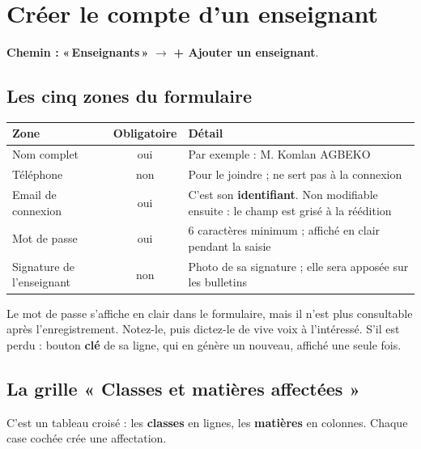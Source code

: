 \documentclass[11pt,a4paper]{article}
\newcommand{\menu}[1]{\textbf{«\,#1\,»}}
\newcommand{\bouton}[1]{\textbf{#1}}
\begin{document}
\newpage

\section{Créer le compte d'un enseignant}

\textbf{Chemin :} \menu{Enseignants} $\rightarrow$ \bouton{+ Ajouter un enseignant}.

\subsection{Les cinq zones du formulaire}

\begin{center}
\renewcommand{\arraystretch}{1.25}
\begin{tabularx}{\textwidth}{@{} >{\raggedright}p{4.2cm} c X@{}}
\toprule
\textbf{Zone} & \textbf{Obligatoire} & \textbf{Détail} \\
\midrule
Nom complet & oui & Par exemple : M. Komlan AGBEKO \\
Téléphone & non & Pour le joindre ; ne sert pas à la connexion \\
Email de connexion & oui & C'est son \textbf{identifiant}. Non modifiable ensuite : le champ
est grisé à la réédition \\
Mot de passe & oui & 6 caractères minimum ; affiché en clair pendant la saisie \\
Signature de l'enseignant & non & Photo de sa signature ; elle sera apposée sur les bulletins \\
\bottomrule
\end{tabularx}
\end{center}

\begin{boiteattention}
Le mot de passe s'affiche en clair dans le formulaire, mais il n'est plus
consultable après l'enregistrement. Notez-le, puis dictez-le de vive voix à
l'intéressé. S'il est perdu : bouton \bouton{clé} de sa ligne, qui en génère un
nouveau, affiché une seule fois.
\end{boiteattention}

\subsection{La grille « Classes et matières affectées »}

C'est un tableau croisé : les \textbf{classes} en lignes, les \textbf{matières} en
colonnes. Chaque case cochée crée une affectation.
\end{document}
